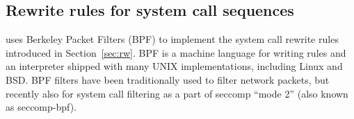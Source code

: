 


\subsection{Rewrite rules for system call sequences}
\label{sec:patternmatching}

\varan uses Berkeley Packet Filters (BPF) to implement the system call
rewrite rules introduced in Section~\ref{sec:rw}.  BPF is a machine
language for writing rules and an interpreter shipped with many UNIX
implementations, including Linux and BSD.  BPF filters have been
traditionally used to filter network packets, but recently also for
system call filtering as a part of seccomp ``mode 2'' (also known as
seccomp-bpf).

